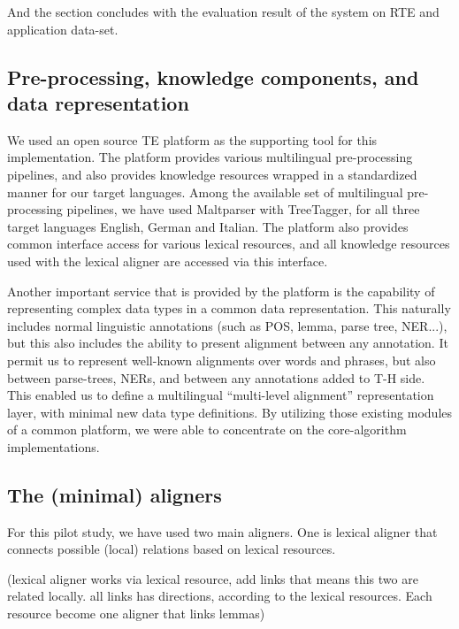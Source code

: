\documentclass[11pt,letterpaper]{article}
\begin{document}
And the section concludes with the evaluation result of the system on
RTE and application data-set.   

\subsection{Pre-processing, knowledge components, and data representation} 
We used an open source TE platform \cite{EOP-demo} as the supporting
tool for this implementation. The platform provides various
multilingual pre-processing pipelines, and also provides knowledge  
resources wrapped in a standardized manner for our target languages.
Among the available set of multilingual pre-processing pipelines, we
have used Maltparser with TreeTagger, for all three target languages
English, German and Italian. The platform also provides common
interface access for various lexical resources, and all knowledge
resources used with the lexical aligner are accessed via this
interface. 

Another important service that is provided by the platform is the
capability of representing complex data types in a common data
representation. This naturally includes normal linguistic annotations
(such as POS, lemma, parse tree, NER...), but this also includes the
ability to present alignment between any annotation. It permit us to
represent well-known alignments over words and phrases, but also
between parse-trees, NERs, and between any annotations added to T-H
side. This enabled us to define a multilingual ``multi-level
alignment''  representation layer, with minimal new data type
definitions.
By utilizing those existing modules of a common platform, we were able
to concentrate on the core-algorithm implementations.   

\subsection{The (minimal) aligners}
For this pilot study, we have used two main aligners. One is lexical
aligner that connects possible (local) relations based on lexical
resources.

(lexical aligner works via lexical resource, add links that means this
two are related locally. all links has directions, according to the
lexical resources. Each resource become one aligner that links lemmas)
\end{document}
